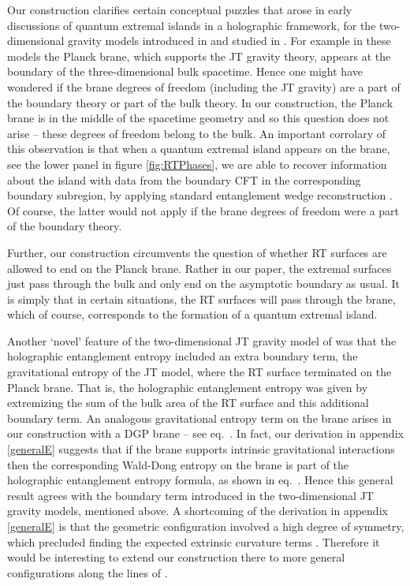  Our construction clarifies certain conceptual puzzles that arose in early discussions of quantum extremal islands in a holographic framework, \eg for the two-dimensional gravity models introduced in \cite{Almheiri:2019hni} and studied in \cite{Almheiri:2019yqk, Chen:2019uhq}. For example in these models the Planck brane, which supports the JT gravity theory, appears at the boundary of the three-dimensional bulk spacetime. Hence one might have wondered if the brane degrees of freedom (including the JT gravity) are a part of the boundary theory or part of the bulk theory. In our construction, the Planck brane is in the middle of the spacetime geometry and so this question does not arise -- these degrees of freedom belong to the bulk. An important corrolary of this observation is that when a quantum extremal island appears on the brane, \eg see the lower panel in figure \ref{fig:RTPhases}, we are able to recover information about the island with data from the boundary CFT in the corresponding boundary subregion, by applying standard entanglement wedge reconstruction \cite{EW1,EW2,EW3,Jafferis:2015del,Dong:2016eik,Faulkner:2017vdd,Cotler:2017erl}. Of course, the latter would not apply if the brane degrees of freedom were a part of the boundary theory.

Further, our construction circumvents the question of whether RT surfaces are allowed to end on the Planck brane. Rather in our paper, the extremal surfaces just pass through the bulk and only end on the asymptotic boundary as usual. It is simply that in certain situations, the RT surfaces will pass through the brane, which of course, corresponds to the formation of a quantum extremal island.

Another `novel' feature of the two-dimensional JT gravity model of \cite{Almheiri:2019hni} was that the holographic entanglement entropy included an extra boundary term, \ie the gravitational entropy of the JT model, where the RT surface terminated on the Planck brane. That is, the holographic entanglement entropy was given by extremizing the sum of the bulk area of the RT surface and this additional boundary term. An analogous gravitational entropy term on the brane arises in our construction with a DGP brane -- see eq.~. In fact, our derivation in appendix \ref{generalE} suggests that if the brane supports intrinsic gravitational interactions then the corresponding Wald-Dong entropy on the brane is part of the holographic entanglement entropy formula, as shown in eq.~. Hence this general result agrees with the boundary term introduced in the two-dimensional JT gravity models, mentioned above. A shortcoming of the derivation in appendix \ref{generalE} is that the geometric configuration involved a high degree of symmetry, which precluded  finding the expected extrinsic curvature terms \cite{Dong:2013qoa}. Therefore it would be interesting to extend our construction there to more general configurations  along the lines of \cite{Lewkowycz:2013nqa,Dong:2016hjy}.

